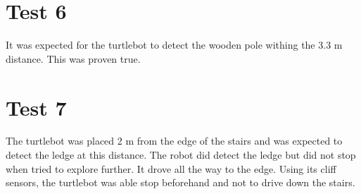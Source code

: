 \section{Test 6}
It was expected for the turtlebot to detect the wooden pole withing the 3.3 m distance. This was proven true.

\section{Test 7}
The turtlebot was placed 2 m from the edge of the stairs and was expected to detect the ledge at this distance. The robot did detect the ledge but did not stop when tried to explore further. It drove all the way to the edge. Using its cliff sensors, the turtlebot was able stop beforehand and not to drive down the stairs.

